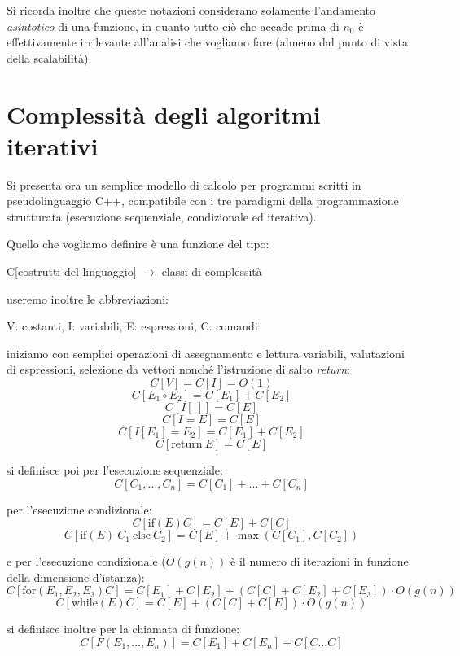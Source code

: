 \documentclass[a4paper,12pt]{article}
\begin{document}
Si ricorda inoltre che queste notazioni considerano solamente l'andamento \textit{asintotico} di una funzione,
in quanto tutto ciò che accade prima di $n_0$ è effettivamente irrilevante all'analisi che vogliamo fare (almeno
dal punto di vista della scalabilità).

\section{Complessità degli algoritmi iterativi}
Si presenta ora un semplice modello di calcolo per programmi scritti in pseudolinguaggio C++, compatibile
con i tre paradigmi della programmazione strutturata (esecuzione sequenziale, condizionale ed iterativa).
\par
Quello che vogliamo definire è una funzione del tipo:
\begin{center}
  C[costrutti del linguaggio] $\rightarrow$ classi di complessità
\end{center}
useremo inoltre le abbreviazioni:
\begin{center}
  V: costanti, I: variabili, E: espressioni, C: comandi
\end{center}

iniziamo con semplici operazioni di assegnamento e lettura variabili, valutazioni di espressioni, selezione
da vettori nonché l'istruzione di salto \textit{return}:
$$ C[V] = C[I] = O(1) $$
$$ C[E_1 \circ E_2] = C[E_1] + C[E_2] $$
$$ C[I[\:]] = C[E] $$
$$ C[I = E] = C[E] $$
$$ C[I[E_1] = E_2] = C[E_1] + C[E_2] $$
$$ C[\mathrm{return} \ E] = C[E] $$

si definisce poi per l'esecuzione sequenziale:
$$ C[{C_1,...,C_n}] = C[C_1] + ... + C[C_n] $$ 

per l'esecuzione condizionale:
$$ C[\mathrm{if}(E)C] = C[E] + C[C] $$
$$ C[\mathrm{if}(E) \: C_1 \: \mathrm{else} \: C_2] = C[E] + \max(C[C_1], C[C_2]) $$ 

e per l'esecuzione condizionale ($O(g(n))$ è il numero di iterazioni in funzione della dimensione d'istanza):
$$ C[\mathrm{for}(E_1, E_2, E_3)C] = C[E_1] + C[E_2] + (C[C] + C[E_2] + C[E_3]) \cdot O(g(n)) $$
$$ C[\mathrm{while}(E)C] = C[E] + (C[C] + C[E]) \cdot O(g(n)) $$

si definisce inoltre per la chiamata di funzione:
$$ C[F(E_1,...,E_n)] = C[E_1] + C[E_n] + C[{C...C}] $$
\end{document}
